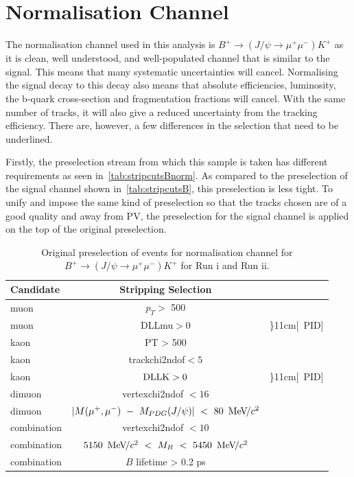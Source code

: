 \section{Normalisation Channel}
\label{nchannel}
The normalisation channel used in this analysis is $ B^{+} \rightarrow (J/\psi \rightarrow \mu^{+} \mu^{-}) K^{+}$
as it is clean, well understood, and well-populated channel that is similar to the signal. This means that many systematic uncertainties will cancel. Normalising the signal decay to this decay also means that absolute efficiencies, luminosity, the b-quark cross-section and fragmentation fractions will cancel. With the same number of tracks, it will also give a reduced uncertainty from the tracking efficiency. There are, however, a few differences in the selection that need to be underlined.

Firstly, the preselection stream from which this sample is taken has different requirements as seen in~\autoref{tab:stripcutsBnorm}. As compared to the preselection of the signal channel shown in~\autoref{tab:stripcutsB}, this preselection is less tight. To unify and impose the same kind of preselection so that the tracks chosen are of a good quality and away from \gls{PV}, the preselection for the signal channel is applied on the top of the original preselection.


\begin{table}%
\begin{center}
\begin{tabular}{l|c l }

    \toprule
     Candidate & Stripping Selection \\ \hline

	muon & $p_{T} >$ 500 \mev \\ 

	
	muon & DLLmu$ > 0$ & \rdelim\}{1}{1cm}[\ \gls{PID}] \\ \hline

	kaon & PT > 500 \mev \\ 
	kaon & \gls{trackchi2ndof}$ < 5$ \\
	kaon & $\rm{DLLK} > 0$ & \rdelim\}{1}{1cm}[\ \gls{PID}] \\ \hline

	dimuon & \gls{vertexchi2ndof} $< 16$ \\
	dimuon & $| M(\mu^{+},\mu^{-})\ -\ M_{PDG}(J/\psi)|\ <\ 80\ {\mathrm{\,Me\kern -0.1em V\!/}c^2}$ \\ \hline

	combination & \gls{vertexchi2ndof} $< 10$ \\
	combination & $5150\ \mevcc\ <\ M_B\ <\ 5450\ \mevcc$ \\
	combination & $B$ lifetime > 0.2 ps \\ \bottomrule
     \end{tabular}

\end{center}
	\caption{Original preselection of events for normalisation channel for $B^{+} \rightarrow (J/\psi \rightarrow \mu^{+} \mu^{-}) K^{+}$ for Run \Rn{1} and Run \Rn{2}. }
\label{tab:stripcutsBnorm}
\end{table}



